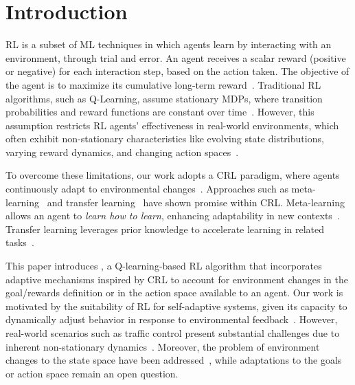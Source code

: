
\section{Introduction}
\label{sec:introduction}

\acf{RL} is a subset of \ac{ML} techniques in which agents learn by interacting with an environment, 
through trial and error. An agent receives a scalar reward (positive or negative) for each interaction 
step, based on the action taken. The objective of the agent is to maximize its cumulative long-term 
reward~\cite{sutton98}. Traditional \ac{RL} algorithms, such as Q-Learning, assume stationary 
\acp{MDP}, where transition probabilities and reward functions are constant over 
time~\cite{meta-rl-traffic}. However, this assumption restricts \ac{RL} agents' effectiveness in 
real-world environments, which often exhibit non-stationary characteristics like evolving state 
distributions, varying reward dynamics, and changing action 
spaces~\cite{khetarpal2022continualreinforcementlearningreview}.

To overcome these limitations, our work adopts a \acf{CRL} paradigm, where agents continuously 
adapt to environmental changes~\cite{abel2023definitioncontinualreinforcementlearning}. Approaches 
such as meta-learning~\cite{zintgraf21} and transfer learning~\cite{zhuang20} have shown promise 
within \ac{CRL}. Meta-learning allows an agent to \emph{learn how to learn}, enhancing adaptability in 
new contexts~\cite{beck2024surveymetareinforcementlearning}. Transfer learning leverages prior 
knowledge to accelerate learning in related tasks~\cite{chen2022transferredqlearning}.

This paper introduces \adaptiverl, a Q-learning-based \ac{RL} algorithm that incorporates adaptive 
mechanisms inspired by \ac{CRL} to account for environment changes in the goal/rewards definition 
or in the action space available to an agent. Our work is motivated by the suitability of \ac{RL} for 
self-adaptive systems, given its capacity to dynamically adjust behavior in response to environmental 
feedback~\cite{HENRICHS2022106940}. However, real-world scenarios such as traffic control 
present substantial challenges due to inherent non-stationary dynamics~\cite{meta-rl-traffic}. 
Moreover, the problem of environment changes to the state space have been 
addressed~\cite{gueriau19}, while adaptations to the goals or action space remain an open question.

